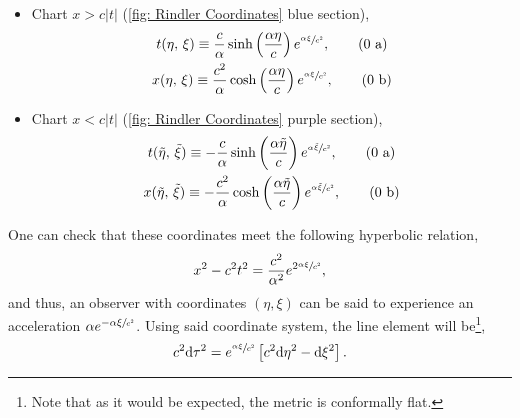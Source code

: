 \begin{itemize}
	\item Chart $x>c|t|$ (\ref{fig: Rindler Coordinates} blue section),
	\begin{subequations}
		\begin{gather}
			t(\eta,\,\xi)\equiv \frac{c}{\alpha}\sinh\left(\frac{\alpha\eta}{c}\right)e^{\sfrac{\alpha\xi}{c^2}},\tag{\theequation \,\,a}\\ x(\eta,\,\xi)\equiv \frac{c^2}{\alpha}\cosh\left(\frac{\alpha\eta}{c}\right)e^{\sfrac{\alpha\xi}{c^2}},\tag{\theequation \,\,b}
		\end{gather}
	\end{subequations}
	\item Chart $x<c|t|$ (\ref{fig: Rindler Coordinates} purple section),
	\begin{subequations}
		\begin{gather}
			t(\tilde\eta,\,\tilde\xi)\equiv- \frac{c}{\alpha}\sinh\left(\frac{\alpha\tilde\eta}{c}\right)e^{\sfrac{\alpha\tilde\xi}{c^2}},\tag{\theequation \,\,a}\\ x(\tilde\eta,\,\tilde\xi)\equiv -\frac{c^2}{\alpha}\cosh\left(\frac{\alpha\tilde\eta}{c}\right)e^{\sfrac{\alpha\tilde\xi}{c^2}},\tag{\theequation \,\,b}
		\end{gather}
	\end{subequations}
\end{itemize}
One can check that these coordinates meet the following hyperbolic relation,
\begin{equation}\label{eq: Hyperbolic general acceleration Unruh}
	x^2-c^2t^2=\frac{c^2}{\alpha^2}e^{2\sfrac{\alpha\xi}{c^2}},
\end{equation}
and thus, an observer with coordinates $(\eta,\xi)$ can be said to experience an acceleration $\alpha e^{-\alpha\xi\sfrac{}{c^2}}$. Using said coordinate system, the line element will be\footnote{Note that as it would be expected, the metric is conformally flat.},
\begin{equation}
	c^2\text{d} \tau^2=e^{\sfrac{\alpha\xi}{c^2}}\left[c^2\text{d}\eta^2-\text{d}\xi^2\right].
\end{equation}


